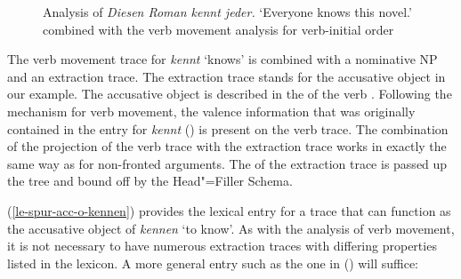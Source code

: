 \begin{figure}
\caption{\label{Abbildung-Diesen-Mann-kennt-jeder}Analysis of \emph{Diesen Roman kennt jeder.} `Everyone knows this novel.' combined with the verb movement analysis for verb-initial order}
\end{figure}%
%
The verb movement trace for \emph{kennt} `knows' is combined with a nominative NP and an extraction trace.
The extraction trace stands for the accusative object in our example. The accusative object is
described in the \compsl of the verb . Following the mechanism for verb movement, the valence information that was originally contained
in the entry for \emph{kennt} () is present on the verb trace. The combination of the projection of the verb trace with
the extraction trace works in exactly the same way as for non-fronted arguments. The \slashv of the extraction trace is passed up the tree
and bound off by the Head"=Filler Schema.

\largerpage[2]
(\ref{le-spur-acc-o-kennen}) provides the lexical entry for a trace
that can function as the accusative object of \emph{kennen} `to know'. As with the analysis of verb movement, it is not necessary to have numerous extraction traces with differing properties 
listed in the lexicon. A more general entry such as the one in () will suffice:

